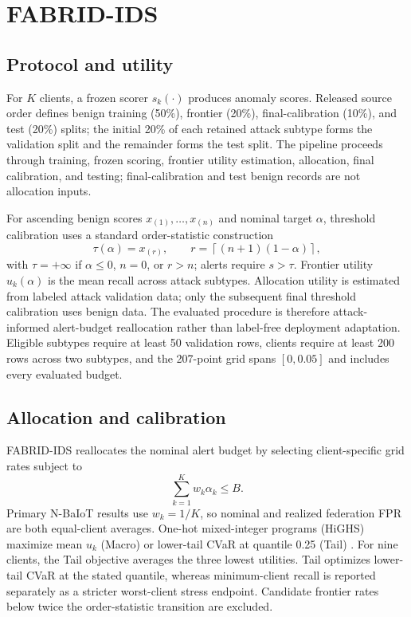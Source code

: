 \documentclass[pdflatex,sn-mathphys-num]{sn-jnl}
\begin{document}
\section{FABRID-IDS}\label{sec:method}
\subsection{Protocol and utility}
For $K$ clients, a frozen scorer $s_k(\cdot)$ produces anomaly scores. Released source order defines benign training (50\%), frontier (20\%), final-calibration (10\%), and test (20\%) splits; the initial 20\% of each retained attack subtype forms the validation split and the remainder forms the test split. The pipeline proceeds through training, frozen scoring, frontier utility estimation, allocation, final calibration, and testing; final-calibration and test benign records are not allocation inputs.

For ascending benign scores $x_{(1)},\ldots,x_{(n)}$ and nominal target $\alpha$, threshold calibration uses a standard order-statistic construction \cite{angelopoulos2024conformalrisk}
\begin{equation}
 \tau(\alpha)=x_{(r)},\qquad r=\left\lceil(n+1)(1-\alpha)\right\rceil,
 \label{eq:orderstat}
\end{equation}
with $\tau=+\infty$ if $\alpha\leq0$, $n=0$, or $r>n$; alerts require $s>\tau$. Frontier utility $u_k(\alpha)$ is the mean recall across attack subtypes. Allocation utility is estimated from labeled attack validation data; only the subsequent final threshold calibration uses benign data. The evaluated procedure is therefore attack-informed alert-budget reallocation rather than label-free deployment adaptation. Eligible subtypes require at least 50 validation rows, clients require at least 200 rows across two subtypes, and the 207-point grid spans $[0,0.05]$ and includes every evaluated budget.

\subsection{Allocation and calibration}
FABRID-IDS reallocates the nominal alert budget by selecting client-specific grid rates subject to
\begin{equation}
 \sum_{k=1}^{K} w_k\alpha_k\leq B. \label{eq:budget}
\end{equation}
Primary N-BaIoT results use $w_k=1/K$, so nominal and realized federation FPR are both equal-client averages. One-hot mixed-integer programs (HiGHS) maximize mean $u_k$ (Macro) or lower-tail CVaR at quantile 0.25 (Tail) \cite{rockafellar2000cvar}. For nine clients, the Tail objective averages the three lowest utilities. Tail optimizes lower-tail CVaR at the stated quantile, whereas minimum-client recall is reported separately as a stricter worst-client stress endpoint. Candidate frontier rates below twice the order-statistic transition are excluded.
\end{document}
